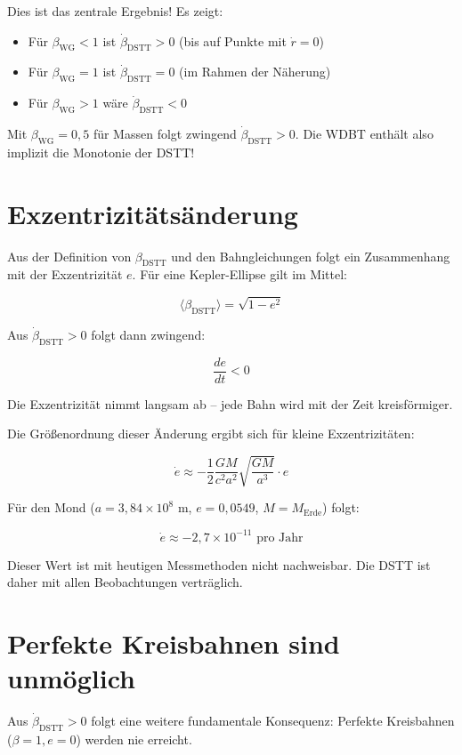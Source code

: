 Dies ist das zentrale Ergebnis! Es zeigt:

\begin{itemize}
    \item Für \(\beta_{\text{WG}} < 1\) ist \(\dot{\beta}_{\text{DSTT}} > 0\) (bis auf Punkte mit \(\dot{r} = 0\))
    \item Für \(\beta_{\text{WG}} = 1\) ist \(\dot{\beta}_{\text{DSTT}} = 0\) (im Rahmen der Näherung)
    \item Für \(\beta_{\text{WG}} > 1\) wäre \(\dot{\beta}_{\text{DSTT}} < 0\)
\end{itemize}

Mit \(\beta_{\text{WG}} = 0,5\) für Massen folgt zwingend \(\dot{\beta}_{\text{DSTT}} > 0\). Die WDBT enthält also implizit die Monotonie der DSTT!

\section{Exzentrizitätsänderung}
\label{sec:exzentrizitaet}

Aus der Definition von \(\beta_{\text{DSTT}}\) und den Bahngleichungen folgt ein Zusammenhang mit der Exzentrizität \(e\). Für eine Kepler-Ellipse gilt im Mittel:

\[
\langle \beta_{\text{DSTT}} \rangle = \sqrt{1 - e^2}
\]

Aus \(\dot{\beta}_{\text{DSTT}} > 0\) folgt dann zwingend:

\[
\frac{de}{dt} < 0
\]

Die Exzentrizität nimmt langsam ab – jede Bahn wird mit der Zeit kreisförmiger.

Die Größenordnung dieser Änderung ergibt sich für kleine Exzentrizitäten:

\[
\dot{e} \approx -\frac{1}{2} \frac{GM}{c^2 a^2} \sqrt{\frac{GM}{a^3}} \cdot e
\]

Für den Mond (\(a = 3,84 \times 10^8\) m, \(e = 0,0549\), \(M = M_{\text{Erde}}\)) folgt:

\[
\dot{e} \approx -2,7 \times 10^{-11} \text{ pro Jahr}
\]

Dieser Wert ist mit heutigen Messmethoden nicht nachweisbar. Die DSTT ist daher mit allen Beobachtungen verträglich.

\section{Perfekte Kreisbahnen sind unmöglich}
\label{sec:kreisbahnen}

Aus \(\dot{\beta}_{\text{DSTT}} > 0\) folgt eine weitere fundamentale Konsequenz: Perfekte Kreisbahnen (\(\beta = 1, e = 0\)) werden nie erreicht.

